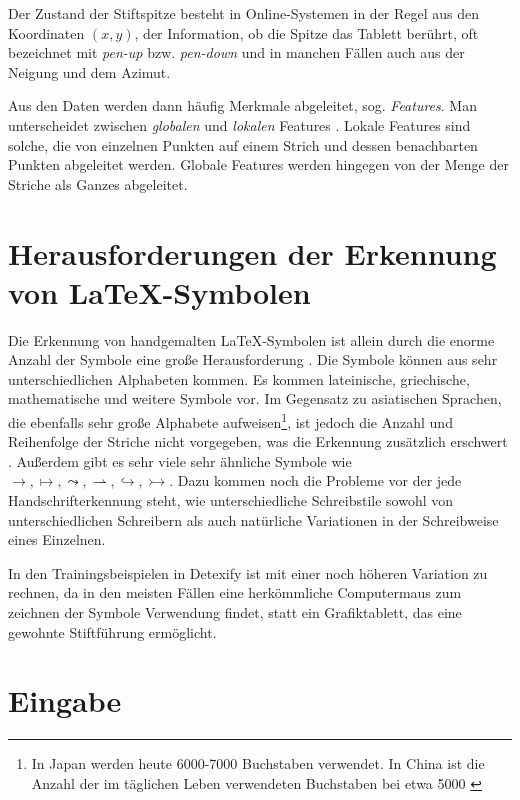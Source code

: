 Der Zustand der Stiftspitze besteht in Online-Systemen in der Regel aus den Koordinaten $(x,y)$, der Information, ob die Spitze das Tablett berührt, oft bezeichnet mit \emph{pen-up} bzw. \emph{pen-down} und in manchen Fällen auch aus der Neigung und dem Azimut.

Aus den Daten werden dann häufig Merkmale abgeleitet, sog. \emph{Features}. Man unterscheidet zwischen \emph{globalen} und \emph{lokalen} Features \cite{Tapia:2007p9160}. Lokale Features sind solche, die von einzelnen Punkten auf einem Strich und dessen benachbarten Punkten abgeleitet werden. Globale Features werden hingegen von der Menge der Striche als Ganzes abgeleitet.

\section[Herausforderungen]{Herausforderungen der Erkennung von \LaTeX-Symbolen}\label{sec:herausforderungen} Die Erkennung von handgemalten \LaTeX-Symbolen ist allein durch die enorme Anzahl der Symbole eine große Herausforderung \cite{Koerich:2003p1562}. Die Symbole können aus sehr unterschiedlichen Alphabeten kommen. Es kommen lateinische, griechische, mathematische und weitere Symbole vor. Im Gegensatz zu asiatischen Sprachen, die ebenfalls sehr große Alphabete aufweisen\footnote{In Japan werden heute 6000-7000 Buchstaben verwendet. In China ist die Anzahl der im täglichen Leben verwendeten Buchstaben bei etwa 5000 \cite{Jaeger:2003p1097}}, ist jedoch die Anzahl und Reihenfolge der Striche nicht vorgegeben, was die Erkennung zusätzlich erschwert \cite{Watt:2005p1816}. Außerdem gibt es sehr viele sehr ähnliche Symbole wie $\rightarrow,\mapsto,\leadsto,\rightharpoonup,\hookrightarrow,\rightarrowtail$. Dazu kommen noch die Probleme vor der jede Handschrifterkennung steht, wie unterschiedliche Schreibstile sowohl von unterschiedlichen Schreibern als auch natürliche Variationen in der Schreibweise eines Einzelnen.

In den Trainingsbeispielen in Detexify ist mit einer noch höheren Variation zu rechnen, da in den meisten Fällen eine herkömmliche Computermaus zum zeichnen der Symbole Verwendung findet, statt ein Grafiktablett, das eine gewohnte Stiftführung ermöglicht.

\section{Eingabe} \label{sec:input}

